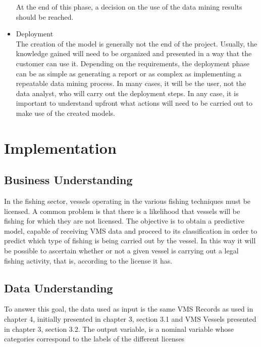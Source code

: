 \begin{itemize}
At the end of this phase, a decision on the use of the data mining results should be reached.
\item Deployment\\
The creation of the model is generally not the end of the project. Usually, the knowledge gained
will need to be organized and presented in a way that the customer can use it. Depending on
the requirements, the deployment phase can be as simple as generating a report or as complex
as implementing a repeatable data mining process. In many cases, it will be the user, not the
data analyst, who will carry out the deployment steps. In any case, it is important to
understand upfront what actions will need to be carried out to make use of
the created models.
\end{itemize}

\section{Implementation} %
\label{sub:implementation}

\subsection{Business Understanding} %
\label{sub:business_understanding}

In the fishing sector, vessels operating in the various fishing techniques must be licensed.
A common problem is that there is a likelihood that vessels will be fishing for which they are not licensed. The objective is to obtain a predictive model, capable of receiving VMS data and proceed to its classification in order to predict which type of fishing is being carried out by the vessel. In this way it will be possible to ascertain whether or not a given vessel is carrying out a legal fishing activity, that is, according to the license it has.





\subsection{Data Understanding} %
\label{sub:data_understanding}

To answer this goal, the data used as input is the same VMS Records as used in chapter 4, initially presented in chapter 3, section 3.1 and VMS Vessels presented in chapter 3, section 3.2. The output variable, is a nominal variable whose categories correspond to the labels of the different licenses

